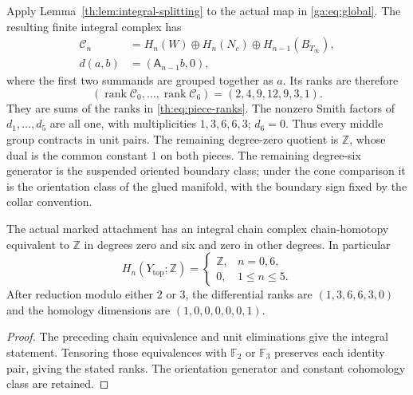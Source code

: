 Apply Lemma~\ref{th:lem:integral-splitting} to the actual map in
\eqref{ga:eq:global}. The resulting finite integral complex has
\[
 \begin{aligned}
 \mathcal C_n&=H_n(W)\oplus H_n(N_c)\oplus H_{n-1}(B_{T_\infty}),\\
 d(a,b)&=(\mathsf A_{n-1}b,0),
 \end{aligned}
\]
where the first two summands are grouped together as $a$.
Its ranks are therefore
\begin{equation}\label{th:eq:complete-ranks}
 (\operatorname{rank}\mathcal C_0,\ldots,\operatorname{rank}\mathcal C_6)
 =(2,4,9,12,9,3,1).
\end{equation}
They are sums of the ranks in \eqref{th:eq:piece-ranks}.
The nonzero Smith factors of $d_1,\ldots,d_5$ are all one, with
multiplicities $1,3,6,6,3$; $d_6=0$.
Thus every middle group contracts in unit pairs. The remaining
degree-zero quotient is $\mathbb Z$, whose dual is the common constant
$1$ on both pieces. The remaining degree-six generator is the
suspended oriented boundary class; under the cone comparison it is
the orientation class of the glued manifold, with the boundary sign
fixed by the collar convention.

\begin{proposition}\label{th:prop:complete-cone}
The actual marked attachment has an integral chain complex
chain-homotopy equivalent to $\mathbb Z$ in degrees zero and six and
zero in other degrees. In particular
\[
 H_n(Y_{\mathrm{top}};\mathbb Z)=
 \begin{cases}\mathbb Z,&n=0,6,\\0,&1\leq n\leq5.\end{cases}
\]
After reduction modulo either $2$ or $3$, the differential ranks are
$(1,3,6,6,3,0)$ and the homology dimensions are $(1,0,0,0,0,0,1)$.
\end{proposition}

\begin{proof}
The preceding chain equivalence and unit eliminations give the integral
statement. Tensoring those equivalences with $\mathbb F_2$ or
$\mathbb F_3$ preserves each identity pair, giving the stated ranks.
The orientation generator and constant cohomology class are retained.
\end{proof}

